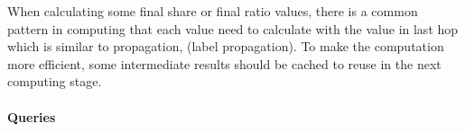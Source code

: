 
When calculating some final share or final ratio values, there is a common
pattern in computing that each value need to calculate with the value in last
hop which is similar to propagation, (\eg label propagation). To make the
computation more efficient, some intermediate results should be cached to reuse
in the next computing stage.


\paragraph{Queries}
{\raggedright
}